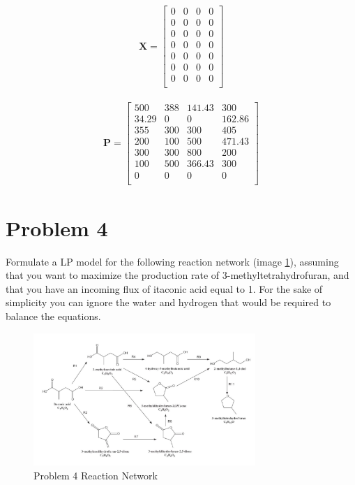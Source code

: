 \documentclass[11pt]{article}
\begin{document}
  \begin{align*}
  \textbf{X} = 
  \begin{bmatrix}
  0 & 0 & 0 & 0 \\
  0 & 0 & 0 & 0 \\
  0 & 0 & 0 & 0 \\
  0 & 0 & 0 & 0 \\
  0 & 0 & 0 & 0 \\
  0 & 0 & 0 & 0 \\
  0 & 0 & 0 & 0 \\
  \end{bmatrix}
  \end{align*}
  
  \begin{align*}
  \textbf{P} = 
  \begin{bmatrix}
  500 & 388 & 141.43 & 300 \\
  34.29 & 0 & 0 & 162.86 \\
  355 & 300 & 300 & 405 \\
  200 & 100 & 500 & 471.43 \\
  300 & 300 & 800 & 200 \\
  100 & 500 & 366.43 & 300 \\
  0 & 0 & 0 & 0 \\
  \end{bmatrix}
  \end{align*}



\section{Problem 4}
Formulate a LP model for the following reaction network (image \ref{fig:problem_4_rn}), assuming that you want
to maximize the production rate of 3-methyltetrahydrofuran, and that you have an incoming
flux of itaconic acid equal to 1. For the sake of simplicity you can ignore the water and
hydrogen that would be required to balance the equations.
\begin{figure}[htbp]
  \centerline{\includegraphics[width=0.75\textwidth]{images/image.png}}
  \caption{Problem 4 Reaction Network}
  \label{fig:problem_4_rn}
\end{figure}
\end{document}
